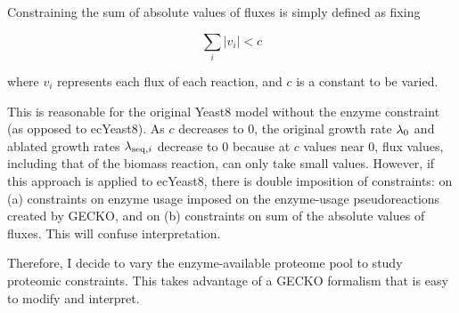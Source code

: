 Constraining the sum of absolute values of fluxes is simply defined as fixing

\begin{equation}
  \sum_{i} |v_{i}| < c
  \label{eq:model-constrain-sumfluxes}
\end{equation}

where $v_{i}$ represents each flux of each reaction, and $c$ is a constant to be varied.

This is reasonable for the original Yeast8 model without the enzyme constraint (as opposed to ecYeast8).
As $c$ decreases to 0, the original growth rate $\lambda_{0}$ and ablated growth rates $\lambda_{\mathrm{seq},i}$ decrease to 0 because at $c$ values near 0, flux values, including that of the biomass reaction, can only take small values.
However, if this approach is applied to ecYeast8,
there is double imposition of constraints: on
(a) constraints on enzyme usage imposed on the enzyme-usage pseudoreactions created by GECKO, and on
(b) constraints on sum of the absolute values of fluxes.
This will confuse interpretation.

Therefore, I decide to vary the enzyme-available proteome pool to study proteomic constraints.
This takes advantage of a GECKO formalism that is easy to modify and interpret.

